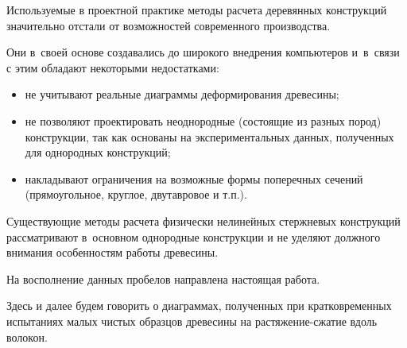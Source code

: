 Используемые в проектной практике методы расчета деревянных конструкций  \cite{Kochenov,SP} значительно отстали от возможностей современного производства. 

Они в~своей основе создавались до широкого внедрения компьютеров и~в~связи с этим обладают некоторыми недостатками:

\begin{itemize}

	\item[--] не учитывают реальные диаграммы деформирования древесины;

	\item[--] не позволяют проектировать неоднородные (состоящие из разных пород) 		конструкции, так как основаны на экспериментальных данных, полученных для однородных конструкций;

	\item[--] накладывают ограничения на возможные формы поперечных сечений (прямоугольное, круглое, двутавровое и т.п.).

\end{itemize}



Существующие методы расчета физически нелинейных стержневых конструкций \cite{Rzinizin, Gemmerling, Lykash, Shapiro, Owen, McGuire} рассматривают в~основном однородные конструкции и не уделяют должного внимания особенностям работы древесины.



На восполнение данных пробелов направлена настоящая работа.





\smallskip




Здесь и далее будем говорить о диаграммах, полученных при кратковременных испытаниях малых чистых образцов древесины на растяжение-сжатие вдоль волокон.





